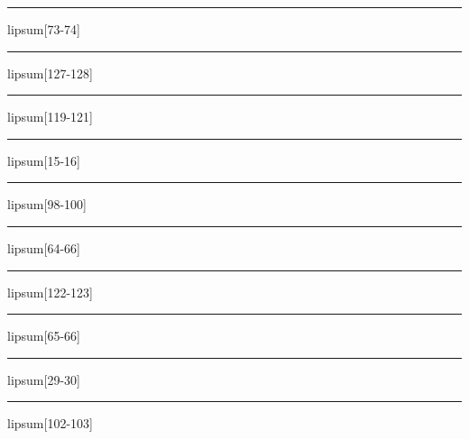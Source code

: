 \documentclass[11pt,a4paper]{article}
\begin{document}
\begin{simplewrap}
  \textcolor{purple!13}{\rule{5.9cm}{2.2cm}}
\end{simplewrap}
lipsum[73-74]

\begin{simplewrap}
  \textcolor{blue!56}{\rule{3.0cm}{2.7cm}}
\end{simplewrap}
lipsum[127-128]

\begin{simplewrap}
  \textcolor{olive!29}{\rule{5.4cm}{6.0cm}}
\end{simplewrap}
lipsum[119-121]

\begin{simplewrap}
  \textcolor{blue!31}{\rule{3.2cm}{8.0cm}}
\end{simplewrap}
lipsum[15-16]

\begin{simplewrap}
  \textcolor{pink!14}{\rule{4.6cm}{3.5cm}}
\end{simplewrap}
lipsum[98-100]

\begin{simplewrap}
  \textcolor{orange!59}{\rule{5.1cm}{5.1cm}}
\end{simplewrap}
lipsum[64-66]

\begin{simplewrap}
  \textcolor{blue!22}{\rule{4.4cm}{8.2cm}}
\end{simplewrap}
lipsum[122-123]

\begin{simplewrap}
  \textcolor{violet!30}{\rule{3.5cm}{7.8cm}}
\end{simplewrap}
lipsum[65-66]

\begin{simplewrap}
  \textcolor{violet!22}{\rule{4.1cm}{2.4cm}}
\end{simplewrap}
lipsum[29-30]

\begin{simplewrap}
  \textcolor{olive!30}{\rule{3.0cm}{8.4cm}}
\end{simplewrap}
lipsum[102-103]
\end{document}
